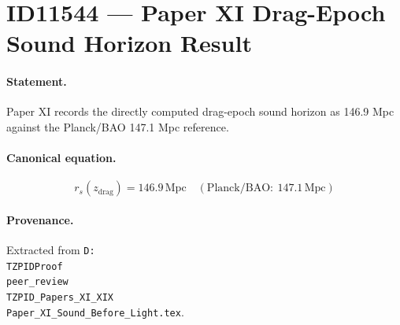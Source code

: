 \section*{ID11544 --- Paper XI Drag-Epoch Sound Horizon Result}

\paragraph{Statement.}
Paper XI records the directly computed drag-epoch sound horizon as 146.9 Mpc against the Planck/BAO 147.1 Mpc reference.

\paragraph{Canonical equation.}
\[
r_s(z_{\mathrm{drag}})=146.9\,\mathrm{Mpc}\quad(\mathrm{Planck/BAO}:\ 147.1\,\mathrm{Mpc})
\]

\paragraph{Provenance.}
Extracted from \texttt{D:\\TZPIDProof\\peer\_review\\TZPID\_Papers\_XI\_XIX\\Paper\_XI\_Sound\_Before\_Light.tex}.
